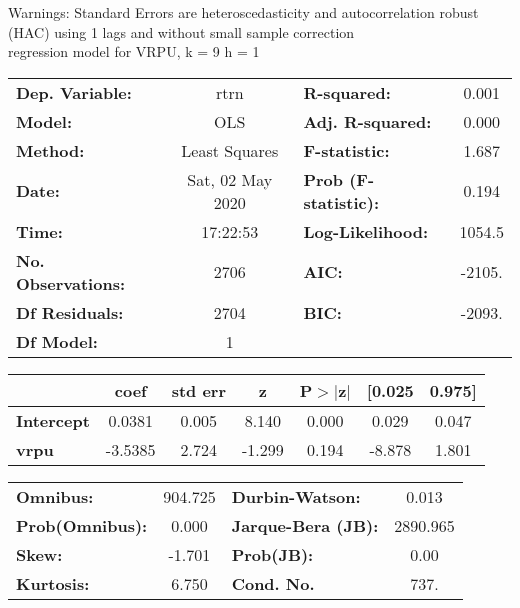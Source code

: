Warnings: \newline
 [1] Standard Errors are heteroscedasticity and autocorrelation robust (HAC) using 1 lags and without small sample correction\\ 

regression model for VRPU, k = 9 h = 1\begin{center}
\begin{tabular}{lclc}
\toprule
\textbf{Dep. Variable:}    &       rtrn       & \textbf{  R-squared:         } &     0.001   \\
\textbf{Model:}            &       OLS        & \textbf{  Adj. R-squared:    } &     0.000   \\
\textbf{Method:}           &  Least Squares   & \textbf{  F-statistic:       } &     1.687   \\
\textbf{Date:}             & Sat, 02 May 2020 & \textbf{  Prob (F-statistic):} &    0.194    \\
\textbf{Time:}             &     17:22:53     & \textbf{  Log-Likelihood:    } &    1054.5   \\
\textbf{No. Observations:} &        2706      & \textbf{  AIC:               } &    -2105.   \\
\textbf{Df Residuals:}     &        2704      & \textbf{  BIC:               } &    -2093.   \\
\textbf{Df Model:}         &           1      & \textbf{                     } &             \\
\bottomrule
\end{tabular}
\begin{tabular}{lcccccc}
                   & \textbf{coef} & \textbf{std err} & \textbf{z} & \textbf{P$> |$z$|$} & \textbf{[0.025} & \textbf{0.975]}  \\
\midrule
\textbf{Intercept} &       0.0381  &        0.005     &     8.140  &         0.000        &        0.029    &        0.047     \\
\textbf{vrpu}      &      -3.5385  &        2.724     &    -1.299  &         0.194        &       -8.878    &        1.801     \\
\bottomrule
\end{tabular}
\begin{tabular}{lclc}
\textbf{Omnibus:}       & 904.725 & \textbf{  Durbin-Watson:     } &    0.013  \\
\textbf{Prob(Omnibus):} &   0.000 & \textbf{  Jarque-Bera (JB):  } & 2890.965  \\
\textbf{Skew:}          &  -1.701 & \textbf{  Prob(JB):          } &     0.00  \\
\textbf{Kurtosis:}      &   6.750 & \textbf{  Cond. No.          } &     737.  \\
\bottomrule
\end{tabular}
\end{center}

